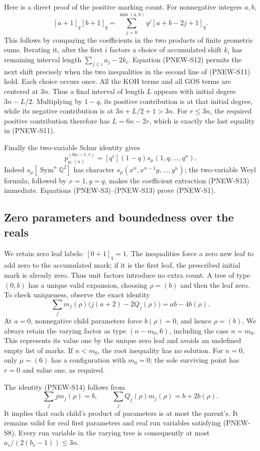 Here is a direct proof of the positive marking count.
For nonnegative integers $a,b$,
\[
 [a+1]_q[b+1]_q
   =\sum_{j=0}^{\min(a,b)}q^j[a+b-2j+1]_q.
 \tag{PNEW-S12}
\]
This follows by comparing the coefficients in the two
products of finite geometric sums.  Iterating it, after
the first $i$ factors a choice of accumulated shift $k_i$
has remaining interval length
$\sum_{j\le i}a_j-2k_i$.  Equation (PNEW-S12) permits the
next shift precisely when the two inequalities in the
second line of (PNEW-S11) hold.  Each choice occurs once.
All the KOH terms and all GOS terms are centered at $3n$.
Thus a final interval of length $L$ appears with initial
degree $3n-L/2$.  Multiplying by $1-q$, its positive
contribution is at that initial degree, while its negative
contribution is at $3n+L/2+1>3n$.
For $r\le3n$, the required positive contribution therefore
has $L=6n-2r$, which is exactly the last equality in
(PNEW-S11).

Finally the two-variable Schur identity gives
\[
 p_{\mu,(n)}^{(6n-r,r)}
           =[q^r](1-q)s_\mu(1,q,\ldots,q^n).
 \tag{PNEW-S13}
\]
Indeed $s_\mu[\operatorname{Sym}^n\mathbb Q^2]$ has
character $s_\mu(x^n,x^{n-1}y,\ldots,y^n)$; the
two-variable Weyl formula, followed by $x=1,y=q$, makes
the coefficient extraction (PNEW-S13) immediate.
Equations (PNEW-S3)--(PNEW-S13) prove (PNEW-S1).

\subsection{Zero parameters and boundedness over the reals}
We retain zero leaf labels: $[0+1]_q=1$.  The inequalities
force a zero new leaf to add zero to the accumulated mark;
if it is the first leaf, the prescribed initial mark is
already zero.  Thus unit factors introduce no extra count.
A tree of type $(0,b)$ has a unique valid expansion, choosing
$\rho=(b)$ and then the leaf zero.  To check uniqueness,
observe the exact identity
\[
 \sum_j m_j(\rho)\bigl(j(a+2)-2Q_j(\rho)\bigr)
                         =ab-4b(\rho).
 \tag{PNEW-S14}
\]
At $a=0$, nonnegative child parameters force $b(\rho)=0$,
and hence $\rho=(b)$.
We always retain the varying factor as type $(n-m_0,6)$,
including the case $n=m_0$.  This represents its value one
by the unique zero leaf and avoids an undefined empty list
of marks.  If $n<m_0$, the root inequality has no solution.
For $n=0$, only $\mu=(6)$ has a configuration with $m_0=0$;
the sole surviving point has $r=0$ and value one, as required.

The identity (PNEW-S14) follows from
\[
 \sum_jj m_j(\rho)=b,
 \qquad
 \sum_j Q_j(\rho)m_j(\rho)=b+2b(\rho).
\]
It implies that each child's product of parameters is at
most the parent's.  It remains valid for real first
parameters and real run variables satisfying (PNEW-S8).
Every run variable in the varying tree is consequently at
most $a_v/(2(b_v-1))\le3n$.

